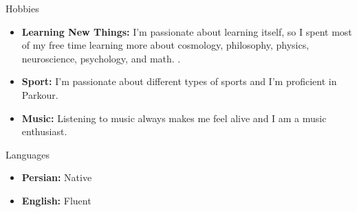 \documentclass[]{mcdowellcv}
\begin{document}
    
    \begin{cvsection}{Hobbies}
    	\begin{cvsubsection}{}{}{}
    	
    	\begin{itemize}
    	    \item \textbf{Learning New Things:} I'm passionate about learning itself, so I spent most of my free time learning more about cosmology, philosophy, physics, neuroscience, psychology, and math.  .
    	    \item \textbf{Sport:} I'm passionate about different types of sports and I'm proficient in Parkour.
    	    \item \textbf{Music:} Listening to music always makes me feel alive and I am a music enthusiast.
	    \end{itemize}
	    
    	\end{cvsubsection}
    \end{cvsection}
	
    \begin{cvsection}{Languages}
    	\begin{cvsubsection}{}{}{}
    	
    	\begin{itemize}
    	    \item \textbf{Persian:} Native
    	    \item \textbf{English:} Fluent
	    \end{itemize}
	    
    	\end{cvsubsection}
    \end{cvsection}
    
\end{document}
